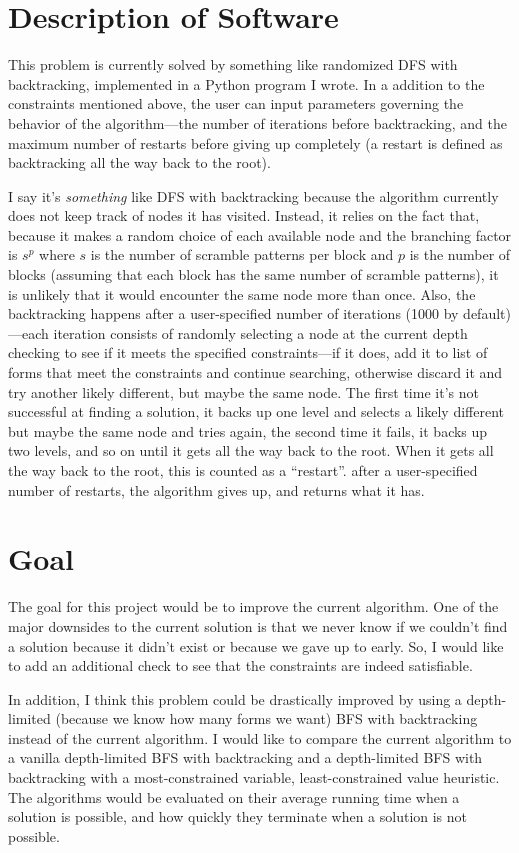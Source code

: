 \documentclass[11pt]{article}
\begin{document}
\section{Description of Software}
\par
This problem is currently solved by something like randomized DFS with
backtracking, implemented in a Python program I wrote.  In a addition
to the constraints mentioned above, the user can input parameters
governing the behavior of the algorithm---the number of iterations
before backtracking, and the maximum number of restarts before giving
up completely (a restart is defined as backtracking all the way back
to the root).
\par
I say it's \emph{something} like DFS with backtracking because the
algorithm currently does not keep track of nodes it has visited.
Instead, it relies on the fact that, because it makes a random choice
of each available node and the branching factor is \(s^p\)
where \(s\)
is the number of scramble patterns per block and \(p\)
is the number of blocks (assuming that each block has the same number
of scramble patterns), it is unlikely that it would encounter the same
node more than once.  Also, the backtracking happens after a
user-specified number of iterations (1000 by default)---each iteration
consists of randomly selecting a node at the current depth checking to
see if it meets the specified constraints---if it does, add it to list
of forms that meet the constraints and continue searching, otherwise
discard it and try another likely different, but maybe the same
node. The first time it's not successful at finding a solution, it
backs up one level and selects a likely different but maybe the same
node and tries again, the second time it fails, it backs up two
levels, and so on until it gets all the way back to the root.  When it
gets all the way back to the root, this is counted as a
``restart''. after a user-specified number of restarts, the algorithm
gives up, and returns what it has.

\section{Goal}
The goal for this project would be to improve the current
algorithm. One of the major downsides to the current solution is that
we never know if we couldn't find a solution because it didn't exist
or because we gave up to early.  So, I would like to add an additional
check to see that the constraints are indeed satisfiable.
\par
In addition, I think this problem could be drastically improved by
using a depth-limited (because we know how many forms we want) BFS
with backtracking instead of the current algorithm. I would like to
compare the current algorithm to a vanilla depth-limited BFS with
backtracking and a depth-limited BFS with backtracking with a
most-constrained variable, least-constrained value heuristic.  The
algorithms would be evaluated on their average running time when a
solution is possible, and how quickly they terminate when a solution
is not possible.
\end{document}
